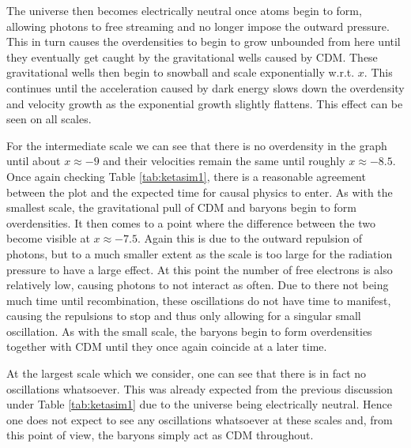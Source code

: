 \documentclass[%
reprint,
 amsmath,amssymb,
 aps,
]{revtex4-2}
\begin{document}
The universe then becomes electrically neutral once atoms begin to form, allowing photons to free streaming and no longer impose the outward pressure. This in turn causes the overdensities to begin to grow unbounded from here until they eventually get caught by the gravitational wells caused by CDM. These gravitational wells then begin to snowball and scale exponentially w.r.t. $x$. This continues until the acceleration caused by dark energy slows down the overdensity and velocity growth as the exponential growth slightly flattens. This effect can be seen on all scales.

For the intermediate scale we can see that there is no overdensity in the graph until about $x\approx-9$ and their velocities remain the same until roughly $x\approx-8.5$. Once again checking Table \ref{tab:ketasim1}, there is a reasonable agreement between the plot and the expected time for causal physics to enter. As with the smallest scale, the gravitational pull of CDM and baryons begin to form overdensities. It then comes to a point where the difference between the two become visible at $x\approx-7.5$. Again this is due to the outward repulsion of photons, but to a much smaller extent as the scale is too large for the radiation pressure to have a large effect. At this point the number of free electrons is also relatively low, causing photons to not interact as often. Due to there not being much time until recombination, these oscillations do not have time to manifest, causing the repulsions to stop and thus only allowing for a singular small oscillation. As with the small scale, the baryons begin to form overdensities together with CDM until they once again coincide at a later time.

At the largest scale which we consider, one can see that there is in fact no oscillations whatsoever. This was already expected from the previous discussion under Table \ref{tab:ketasim1} due to the universe being electrically neutral. Hence one does not expect to see any oscillations whatsoever at these scales and, from this point of view, the baryons simply act as CDM throughout.
\end{document}
